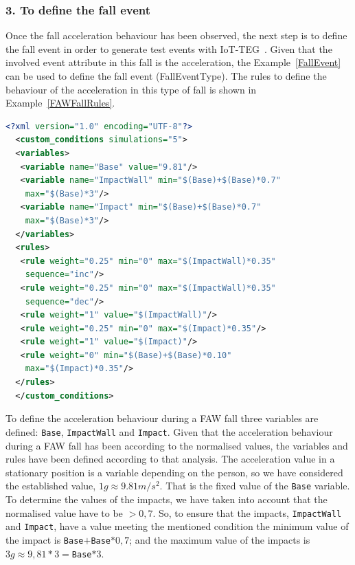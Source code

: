 \documentclass[journal]{IEEEtran}
\begin{document}
\subsubsection*{3. To define the fall event} Once the fall acceleration behaviour has been observed, the next step is to define the 
fall event in order to generate test events with IoT-TEG~\cite{TesisGutierrez2017,Gutierrez2017}. Given that the involved event 
attribute in this fall is the acceleration, the Example~\ref{FallEvent} can be used to define 
the fall event (FallEventType). The rules to define the behaviour of the acceleration in this type of fall is shown in 
Example~\ref{FAWFallRules}.

\begin{lstlisting}[basicstyle=\ttfamily\scriptsize,language=XML,caption={Rules to define a FAW fall},label=FAWFallRules]
  <?xml version="1.0" encoding="UTF-8"?>
  <custom_conditions simulations="5">
  <variables>
   <variable name="Base" value="9.81"/>
   <variable name="ImpactWall" min="$(Base)+$(Base)*0.7" 
    max="$(Base)*3"/>
   <variable name="Impact" min="$(Base)+$(Base)*0.7" 
    max="$(Base)*3"/>
  </variables>
  <rules>
   <rule weight="0.25" min="0" max="$(ImpactWall)*0.35" 
    sequence="inc"/>
   <rule weight="0.25" min="0" max="$(ImpactWall)*0.35" 
    sequence="dec"/>
   <rule weight="1" value="$(ImpactWall)"/>
   <rule weight="0.25" min="0" max="$(Impact)*0.35"/>
   <rule weight="1" value="$(Impact)"/>
   <rule weight="0" min="$(Base)+$(Base)*0.10"
    max="$(Impact)*0.35"/>
  </rules>
  </custom_conditions>
\end{lstlisting}

To define the acceleration behaviour during a FAW fall three variables are defined: \texttt{\small{Base}}, 
\texttt{\small{ImpactWall}} and \texttt{\small{Impact}}. Given that the acceleration behaviour during a FAW fall has
been according to the normalised values, the variables and rules have been defined according to 
that analysis. The acceleration value in a stationary position is a variable depending on the person, so 
we have considered the established value, $1g\approx9.81m/s^{2}$. That is the fixed value of the 
\texttt{\small{Base}} variable. To determine the values of the impacts, we have taken into account that the 
normalised value have to be $> 0,7$. So, to ensure that the impacts, \texttt{\small{ImpactWall}} and 
\texttt{\small{Impact}}, have a value meeting the mentioned condition the minimum value of the impact is  
\texttt{\small{Base}}$+$\texttt{\small{Base}}$*0,7$; and the maximum value of the
impacts is $3g\approx9,81*3=$\texttt{\small{Base}}$*3$.
\end{document}
